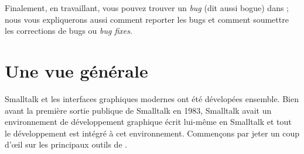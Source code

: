 \documentclass[a4paper,10pt,twoside]{book}
\begin{document}
Finalement, en travaillant, vous pouvez trouver un \emph{bug} (dit aussi bogue) dans \pharo;
nous vous expliquerons aussi comment reporter les bugs
et comment soumettre les corrections de bugs ou \emph{bug fixes}.

\section{Une vue g\'en\'erale}

Smalltalk et les interfaces graphiques modernes ont \'et\'e d\'evelop\'ees ensemble.
Bien avant la premi\`ere sortie publique de Smalltalk en 1983, Smalltalk
avait un environnement de d\'eveloppement graphique écrit lui-même en Smalltalk et
tout le d\'eveloppement est intégré à cet environnement.
Commen\c{c}ons par jeter un coup d'\oe il sur les principaux outils de
\pharo. %
\end{document}
